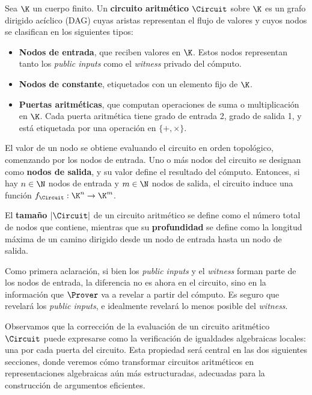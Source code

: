 \begin{definition}
	Sea $\K$ un cuerpo finito. Un \textbf{circuito aritmético} $\Circuit$ sobre $\K$ es un grafo dirigido acíclico (DAG) cuyas aristas representan el flujo de valores y cuyos nodos se clasifican en los siguientes tipos:
	\begin{itemize}[noitemsep]
		\item \textbf{Nodos de entrada}, que reciben valores en $\K$. Estos nodos representan tanto los \textit{public inputs} como el \textit{witness} privado del cómputo.
		\item \textbf{Nodos de constante}, etiquetados con un elemento fijo de $\K$.
		\item \textbf{Puertas aritméticas}, que computan operaciones de suma o multiplicación en $\K$. Cada puerta aritmética tiene grado de entrada 2, grado de salida 1, y está etiquetada por una operación en $\{+, \times\}$.
	\end{itemize}
	
		El valor de un nodo se obtiene evaluando el circuito en orden topológico, comenzando por los nodos de entrada. Uno o más nodos del circuito se designan como \textbf{nodos de salida}, y su valor define el resultado del cómputo. Entonces, si hay $n \in \N$ nodos de entrada y $m \in \N$ nodos de salida, el circuito induce una función $f_\Circuit : \K^n \to \K^m$.
	
	El \textbf{tamaño} $|\Circuit|$ de un circuito aritmético se define como el número total de nodos que contiene, mientras que su \textbf{profundidad} se define como la longitud máxima de un camino dirigido desde un nodo de entrada hasta un nodo de salida.
\end{definition}

Como primera aclaración, si bien los \textit{public inputs} y el \textit{witness} forman parte de los nodos de entrada, la diferencia no es ahora en el circuito, sino en la información que $\Prover$ va a revelar a partir del cómputo. Es seguro que revelará los \textit{public inputs}, e idealmente revelará lo menos posible del \textit{witness}.

Observamos que la corrección de la evaluación de un circuito aritmético $\Circuit$ puede expresarse como la verificación de igualdades algebraicas locales: una por cada puerta del circuito. Esta propiedad será central en las dos siguientes secciones, donde veremos cómo transformar circuitos aritméticos en representaciones algebraicas aún más estructuradas, adecuadas para la construcción de argumentos \SNARK eficientes.

